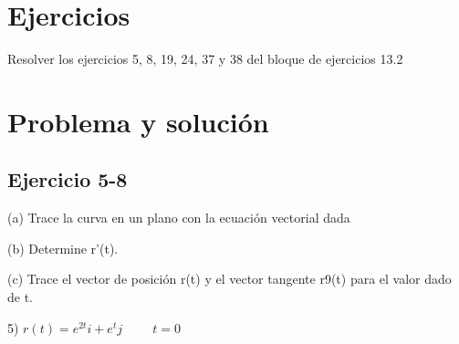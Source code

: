 \def \unidad{Universidad de Cuenca}
\def \programa{Ingeniería en Telecomunicaciones}
\def \curso{Grupo \# 3 - Cálculo en varias variables}
\def \titulo{Hola}
\def \subtitulo {Resolución del ejercicio planteado en clase}
\def \autores{
    Javier Alexander Procel Morocho\\
    javier.procel@ucuenca.edu.ec\\
    
    \vspace{0.5cm}
    
    Mateo Feijo\\
    Correo electrónico\\

    \vspace{0.5cm}
    
    Julio Josué Macas Guamán\\
    julio.macas@ucuenca.edu.ec\\
}
\def \fecha{Octubre 2023}
\def \lugar{
    Azuay, 
    Cuenca
}



\tableofcontents

\section{Ejercicios}\label{intro}

Resolver los ejercicios 5, 8, 19, 24, 37 y 38 del bloque de ejercicios 13.2
\section{Problema y solución}\label{antecedentes}

\subsection{Ejercicio 5-8}
 
   \item (a) Trace la curva en un plano con la ecuación vectorial dada
   \item (b) Determine r’(t).
   \item (c) Trace el vector de posición r(t) y el vector tangente r9(t) para
el valor dado de t. \vspace{3mm}
 
   \item 5) $r(t)= e^{2t}i+ e^tj \hspace{1cm}    t= 0$ \vspace{3mm}

